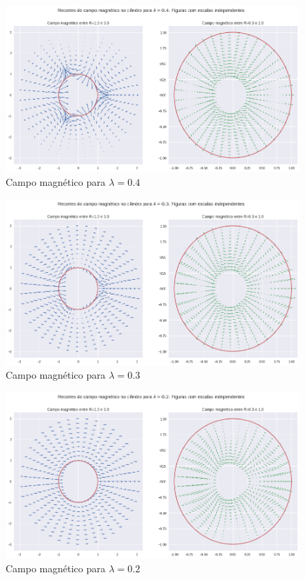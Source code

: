 \documentclass[%
 reprint,
 amsmath,amssymb,
 aps,
]{revtex4-1}
\begin{document}
\begin{figure}[h]
    \caption{Campo magnético para $\lambda=0.4$}
    \includegraphics[width=0.99\textwidth]{lambda_04.png}
\end{figure}

\begin{figure}[h]
    \caption{Campo magnético para $\lambda=0.3$}
    \includegraphics[width=0.99\textwidth]{lambda_03.png}
\end{figure}

\begin{figure}[h]
    \caption{Campo magnético para $\lambda=0.2$}
    \includegraphics[width=0.99\textwidth]{lambda_02.png}
\end{figure}
\end{document}
